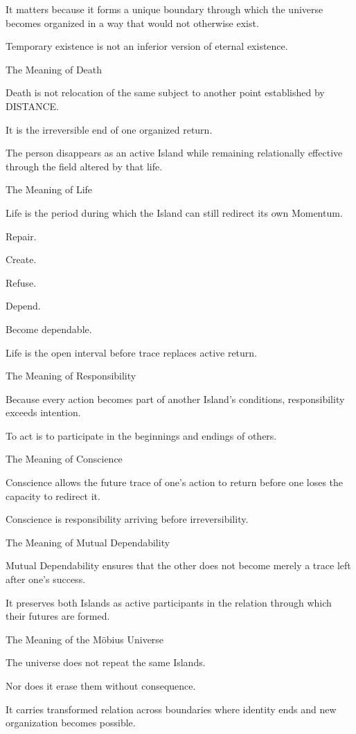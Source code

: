 It matters because it forms a unique boundary through which the universe becomes organized in a way that would not otherwise exist.

Temporary existence is not an inferior version of eternal existence.

The Meaning of Death

Death is not relocation of the same subject to another point established by DISTANCE.

It is the irreversible end of one organized return.

The person disappears as an active Island while remaining relationally effective through the field altered by that life.

The Meaning of Life

Life is the period during which the Island can still redirect its own Momentum.

Repair.

Create.

Refuse.

Depend.

Become dependable.

Life is the open interval before trace replaces active return.

The Meaning of Responsibility

Because every action becomes part of another Island’s conditions, responsibility exceeds intention.

To act is to participate in the beginnings and endings of others.

The Meaning of Conscience

Conscience allows the future trace of one’s action to return before one loses the capacity to redirect it.

Conscience is responsibility arriving before irreversibility.

The Meaning of Mutual Dependability

Mutual Dependability ensures that the other does not become merely a trace left after one’s success.

It preserves both Islands as active participants in the relation through which their futures are formed.

The Meaning of the Möbius Universe

The universe does not repeat the same Islands.

Nor does it erase them without consequence.

It carries transformed relation across boundaries where identity ends and new organization becomes possible.

